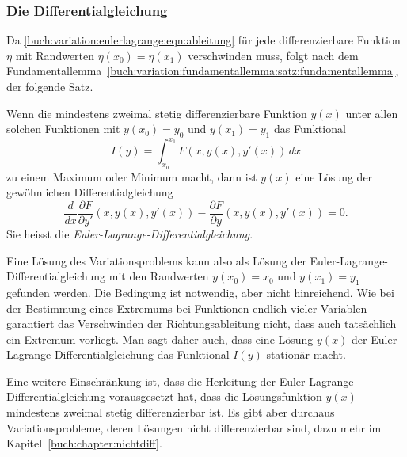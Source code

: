 %
%
\subsubsection{Die Differentialgleichung}
Da
\eqref{buch:variation:eulerlagrange:eqn:ableitung}
für jede differenzierbare Funktion $\eta$ mit Randwerten
$\eta(x_0)=\eta(x_1)$ verschwinden muss, folgt nach dem
Fundamentallemma~\ref{buch:variation:fundamentallemma:satz:fundamentallemma},
der folgende Satz. 

\begin{satz}
\label{buch:variation:eulerlagrange:satz:eulerlagrange}
Wenn die mindestens zweimal stetig differenzierbare Funktion $y(x)$
unter allen solchen Funktionen mit $y(x_0)=y_0$ und $y(x_1)=y_1$
das Funktional
\[
I(y)
=
\int_{x_0}^{x_1}
F(x,y(x),y'(x))\,dx
\]
zu einem Maximum oder Minimum macht, dann ist $y(x)$ eine Lösung der
gewöhnlichen Differentialgleichung
\begin{equation}
\frac{d}{dx}
\frac{\partial F}{\partial y'}(x,y(x),y'(x))
-
\frac{\partial F}{\partial y}(x,y(x),y'(x))
=
0.
\label{buch:variation:eulerlagrange:eqn:eulerlagrange}
\end{equation}
Sie heisst die {\em Euler-Lagrange-Differentialgleichung}.
\end{satz}

Eine Lösung des Variationsproblems kann also als Lösung der
Euler-Lagrange-Dif\-fe\-ren\-tial\-glei\-chung mit den Randwerten
$y(x_0)=x_0$ und $y(x_1)=y_1$ gefunden werden.
Die Bedingung ist notwendig, aber nicht hinreichend.
Wie bei der Bestimmung eines Extremums bei Funktionen endlich
vieler Variablen garantiert das Verschwinden der Richtungsableitung
nicht, dass auch tatsächlich ein Extremum vorliegt.
Man sagt daher auch, dass eine Lösung $y(x)$ der
Euler-Lagrange-Differentialgleichung das Funktional $I(y)$
stationär macht.

Eine weitere Einschränkung ist, dass die Herleitung der
Euler-Lagrange-Differential\-gleichung vorausgesetzt hat,
dass die Lösungsfunktion $y(x)$ mindestens zweimal 
stetig differenzierbar ist.
Es gibt aber durchaus Variationsprobleme, deren Lösungen
nicht differenzierbar sind, dazu mehr im Kapitel~\ref{buch:chapter:nichtdiff}.

